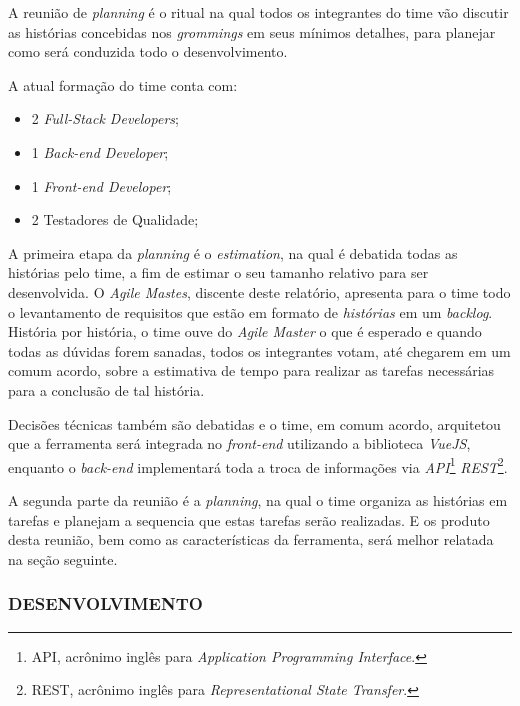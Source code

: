 \documentclass[
  12pt,				%
  openany,
  oneside,
  a4paper,			%
  english,			%
  brazil
]{article}
\numberwithin{figure}{section}
\numberwithin{table}{section}
\begin{document}
A reunião de \textit{planning} é o ritual na qual todos os integrantes do time vão discutir as histórias concebidas nos \textit{grommings} em seus mínimos detalhes, para  planejar como será conduzida todo o desenvolvimento.

A atual formação do time conta com:

	\vspace{-10mm}
\begin{singlespace}
	\begin{itemize}
		\item 2 \textit{Full-Stack Developers};
		\item 1 \textit{Back-end Developer};
		\item 1 \textit{Front-end Developer};
		\item 2 Testadores de Qualidade;
	\end{itemize}
\end{singlespace}
\vspace{-5mm}

A primeira etapa da \textit{planning} é o \textit{estimation}, na qual é debatida todas as histórias pelo time, a fim de estimar o seu tamanho relativo para ser desenvolvida. O \textit{Agile Mastes}, discente deste relatório, apresenta para o time todo o levantamento de requisitos que estão em formato de \textit{histórias} em um \textit{backlog}. História por história, o time ouve do \textit{Agile Master} o que é esperado e quando todas as dúvidas forem sanadas, todos os integrantes votam, até chegarem em um comum acordo, sobre a estimativa de tempo para realizar as tarefas necessárias para a conclusão de tal história.

Decisões técnicas também são debatidas e o time, em comum acordo, arquitetou que a ferramenta será integrada no \textit{front-end} utilizando a biblioteca \textit{VueJS}, enquanto o \textit{back-end} implementará toda a troca de informações via \textit{API}\footnote{API, acrônimo inglês para \textit{Application Programming Interface}.} \textit{REST}\footnote{REST, acrônimo inglês para \textit{Representational State Transfer}.}.

A segunda parte da reunião é a \textit{planning}, na qual o time organiza as histórias em tarefas e planejam a sequencia que estas tarefas serão realizadas. E os produto desta reunião, bem como as características da ferramenta, será melhor relatada na seção seguinte.


\subsubsection{DESENVOLVIMENTO}
\end{document}
